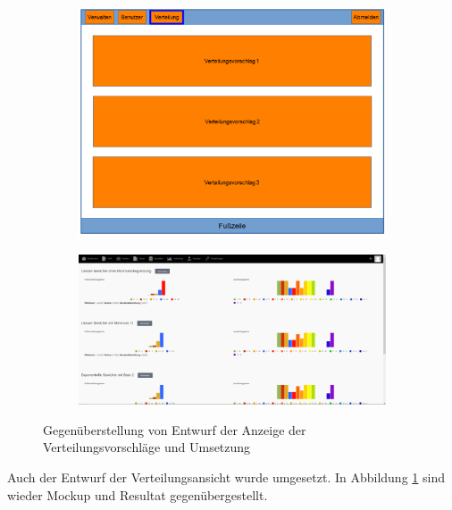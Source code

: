        \begin{figure}[p]
            \centering
            \begin{subfigure}{0.9\textwidth}
                \includegraphics[width=1.0\textwidth]{./implementation/images/MockUpsBackend/backendDistribution.png}
            \end{subfigure}
            \begin{subfigure}{\textwidth}
                \includegraphics[width=1.0\textwidth]{./implementation/images/distribution.png}
            \end{subfigure}
            \caption{Gegenüberstellung von Entwurf der Anzeige der Verteilungsvorschläge und Umsetzung}
            \label{fig:comparisonDistribution}
        \end{figure}
    
        Auch der Entwurf der Verteilungsansicht wurde umgesetzt.
        In Abbildung \ref{fig:comparisonDistribution} sind wieder Mockup und Resultat gegenübergestellt.
		\pagebreak

